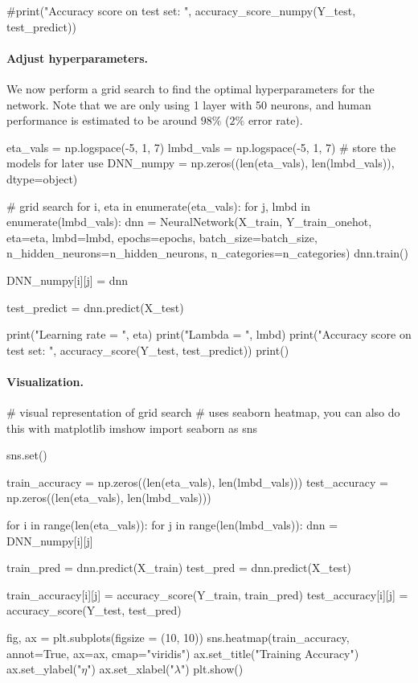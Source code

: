\documentclass[%
oneside,                 %
final,                   %
10pt]{article}
\begin{document}
#print("Accuracy score on test set: ", accuracy_score_numpy(Y_test, test_predict))
\epycod


\paragraph{Adjust hyperparameters.}
We now perform a grid search to find the optimal hyperparameters for the network.  
Note that we are only using 1 layer with 50 neurons, and human performance is estimated to be around $98\%$ ($2\%$ error rate).

\bpycod
eta_vals = np.logspace(-5, 1, 7)
lmbd_vals = np.logspace(-5, 1, 7)
# store the models for later use
DNN_numpy = np.zeros((len(eta_vals), len(lmbd_vals)), dtype=object)

# grid search
for i, eta in enumerate(eta_vals):
    for j, lmbd in enumerate(lmbd_vals):
        dnn = NeuralNetwork(X_train, Y_train_onehot, eta=eta, lmbd=lmbd, epochs=epochs, batch_size=batch_size,
                            n_hidden_neurons=n_hidden_neurons, n_categories=n_categories)
        dnn.train()
        
        DNN_numpy[i][j] = dnn
        
        test_predict = dnn.predict(X_test)
        
        print("Learning rate  = ", eta)
        print("Lambda = ", lmbd)
        print("Accuracy score on test set: ", accuracy_score(Y_test, test_predict))
        print()
\epycod

\paragraph{Visualization.}
\bpycod
# visual representation of grid search
# uses seaborn heatmap, you can also do this with matplotlib imshow
import seaborn as sns

sns.set()

train_accuracy = np.zeros((len(eta_vals), len(lmbd_vals)))
test_accuracy = np.zeros((len(eta_vals), len(lmbd_vals)))

for i in range(len(eta_vals)):
    for j in range(len(lmbd_vals)):
        dnn = DNN_numpy[i][j]
        
        train_pred = dnn.predict(X_train) 
        test_pred = dnn.predict(X_test)

        train_accuracy[i][j] = accuracy_score(Y_train, train_pred)
        test_accuracy[i][j] = accuracy_score(Y_test, test_pred)

        
fig, ax = plt.subplots(figsize = (10, 10))
sns.heatmap(train_accuracy, annot=True, ax=ax, cmap="viridis")
ax.set_title("Training Accuracy")
ax.set_ylabel("$\eta$")
ax.set_xlabel("$\lambda$")
plt.show()
\end{document}
